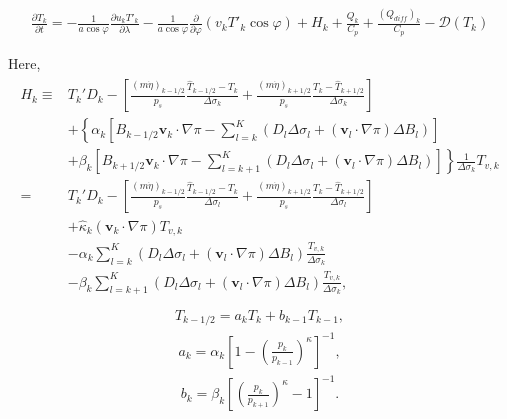\begin{eqnarray}
  \frac{\partial T_k}{\partial t}
     =  - \frac{1}{a\cos\varphi}
               \frac{\partial u_k T'_k}{\partial \lambda}
          - \frac{1}{a\cos\varphi}
               \frac{\partial }{\partial \varphi} (v_k T'_k \cos\varphi)
          + H_k
        + \frac{Q_k}{C_{p}}
          + \frac{(Q_{diff})_k}{C_p}
          - {\mathcal D}(T_k)  \end{eqnarray}

Here, \begin{eqnarray}
\begin{aligned}
   H_k
     \equiv &  T_k' D_k
              - \left[   \frac{(m\dot{\eta})_{k-1/2}}{p_s} \frac{\hat{T}_{k-1/2} - T_k}{\Delta\sigma_k}
               + \frac{(m\dot{\eta})_{k+1/2}}{p_s} \frac{T_k - \hat{T}_{k+1/2}}{\Delta\sigma_k} \right] \\
        &+ \left\{ \alpha_k
                    \left[ B_{k-1/2} {\mathbf{v}}_k \cdot \nabla \pi
                          - \sum_{l=k}^{K}
                           (D_l \Delta \sigma_l + ({\mathbf{v}}_l \cdot \nabla \pi)\Delta B_l)
                    \right]
             \right. \\
          &+ \left. \beta_k
                     \left[ B_{k+1/2} {\mathbf{v}}_k \cdot \nabla \pi
                          - \sum_{l=k+1}^{K}
                           (D_l \Delta \sigma_l + ({\mathbf{v}}_l \cdot \nabla \pi)\Delta B_l)
                    \right]
              \right\}
              \frac{1}{\Delta \sigma_k} T_{v,k}\\
     = & T_k' D_k
          - \left[ \frac{(m\dot{\eta})_{k-1/2}}{p_s} \frac{\hat{T}_{k-1/2} - T_k}{\Delta \sigma_l}
               + \frac{(m\dot{\eta})_{k+1/2}}{p_s} \frac{T_k - \hat{T}_{k+1/2}}{\Delta \sigma_l} \right] \\
        &+ \hat{\kappa}_k ({\mathbf{v}}_k \cdot \nabla \pi) T_{v,k} \\
        &- \alpha_k \sum_{l=k}^{K}
                           (D_l \Delta \sigma_l + ({\mathbf{v}}_l \cdot \nabla \pi)\Delta B_l)
                            \frac{T_{v,k}}{\Delta \sigma_k} \\
        &- \beta_k \sum_{l=k+1}^{K}
                           (D_l \Delta \sigma_l + ({\mathbf{v}}_l \cdot \nabla \pi)\Delta B_l)
                            \frac{T_{v,k}}{\Delta \sigma_k},
\end{aligned}
\end{eqnarray} \begin{eqnarray}
  \hat{T}_{k-1/2}
   = a_k T_k + b_{k-1} T_{k-1},
\end{eqnarray} \begin{eqnarray}
  a_k  =  \alpha_k
              \left[ 1- \left( \frac{ p_k }{ p_{k-1} }
                        \right)^{\kappa} \right]^{-1},
\end{eqnarray} \begin{eqnarray}
  b_k  =  \beta_k
              \left[ \left( \frac{ p_k }{ p_{k+1} }
                     \right)^{\kappa} - 1 \right]^{-1} .\end{eqnarray}

